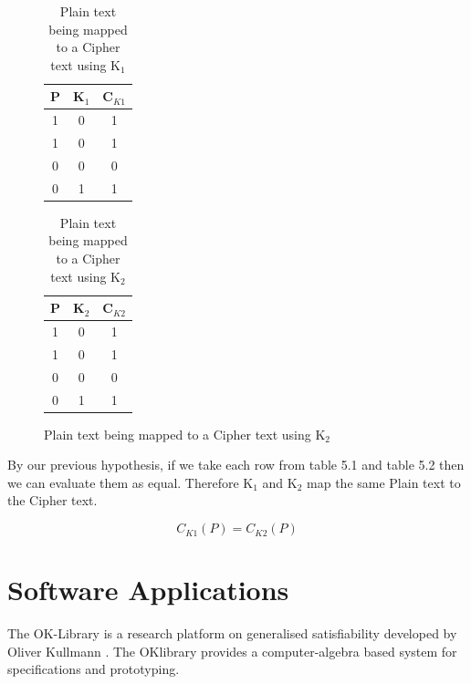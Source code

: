 \documentclass[11pt,a4paper, notitlepage]{report}
\begin{document}
\begin{figure}
\begin{table}[H]
\centering
\label{tab:C1}
\begin{tabular}{|c|c|c|}
\hline
P & K$_1$ & C$_{K1}$ \\ \hline
1 & 0 & 1 \\
1 & 0 & 1 \\
0 & 0 & 0 \\
0 & 1 & 1 \\
\hline
\end{tabular}
\caption{Plain text being mapped to a Cipher text using K$_1$}
\end{table}

\begin{table}[H]
\centering
\label{tab:C2}
\begin{tabular}{|c|c|c|}
\hline
P & K$_2$ & C$_{K2}$ \\ \hline
1 & 0 & 1 \\
1 & 0 & 1 \\
0 & 0 & 0 \\
0 & 1 & 1 \\
\hline
\end{tabular}
\caption{Plain text being mapped to a Cipher text using K$_2$}
\end{table}
\end{figure}

By our previous hypothesis, if we take each row from table 5.1 and table 5.2 then we can evaluate them as equal. Therefore K$_1$ and K$_2$ map the same Plain text to the Cipher text.

\begin{displaymath}
C_{K1}(P) = C_{K2}(P)
\end{displaymath}
















\chapter{Software Applications}
\label{cha:softApp}

The OK-Library is a research platform on generalised satisfiability developed by Oliver Kullmann \cite{Oliver2013OKlibrary}. The OKlibrary provides a computer-algebra based system for specifications and prototyping.
\end{document}
